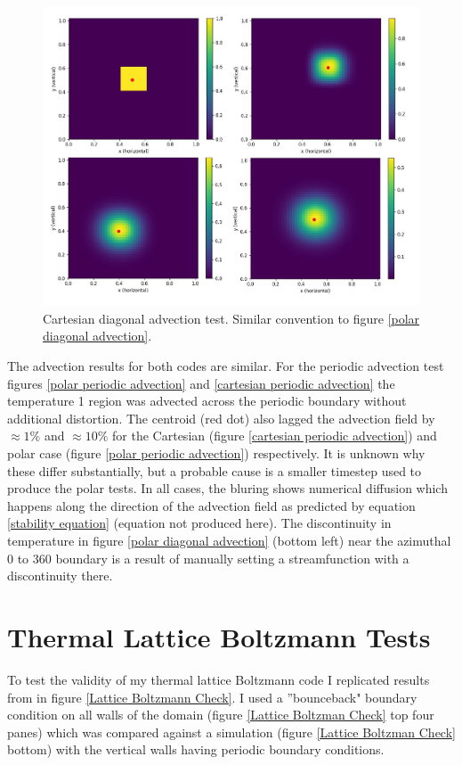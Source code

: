 \documentclass{article}
\begin{document}
\begin{figure}[h!]
	\centering 
	\includegraphics{cartesianDiagonal/CartesianDiagonalFigure.jpg}
	\caption{Cartesian diagonal advection test. Similar convention to figure \ref{polar diagonal advection}. }
	\label{cartesian diagonal advection}
\end{figure}

\noindent The advection results for both codes are similar. For the periodic advection test figures \ref{polar periodic advection} and \ref{cartesian periodic advection} the temperature 1 region was advected across the periodic boundary without additional distortion. The centroid (red dot) also lagged the advection field by $\approx 1 \%$ and $\approx 10 \%$ for the Cartesian (figure \ref{cartesian periodic advection}) and polar case (figure \ref{polar periodic advection}) respectively. It is unknown why these differ substantially, but a probable cause is a smaller timestep used to produce the polar tests. In all cases, the bluring shows numerical diffusion which happens along the direction of the advection field as predicted by equation \ref{stability equation} (equation not produced here). The discontinuity in temperature in figure \ref{polar diagonal advection} (bottom left) near the azimuthal 0 to 360 boundary is a result of manually setting a streamfunction with a discontinuity there.


\section*{Thermal Lattice Boltzmann Tests}
To test the validity of my thermal lattice Boltzmann code I replicated results from \cite{mora2017simulation} in figure \ref{Lattice Boltzmann 
Check}. I used a ''bounceback" boundary condition on all walls of the domain (figure \ref{Lattice Boltzman Check} top four panes) which was compared against a simulation (figure \ref{Lattice Boltzman Check} bottom) with the vertical walls having periodic boundary conditions. 
\end{document}
